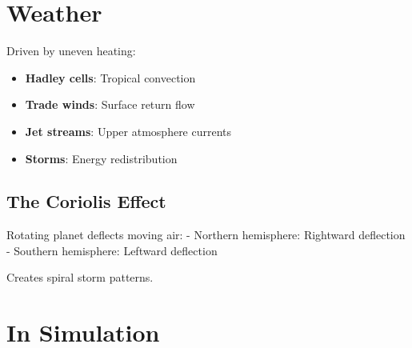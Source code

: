 \documentclass[
  11pt,
  letterpaper,
  twoside,
  openright]{book}
\providecommand{\tightlist}{%
  \setlength{\itemsep}{0pt}\setlength{\parskip}{0pt}}
\begin{document}
\section{Weather}\label{weather}

Driven by uneven heating:

\begin{itemize}
\tightlist
\item
  \textbf{Hadley cells}: Tropical convection
\item
  \textbf{Trade winds}: Surface return flow
\item
  \textbf{Jet streams}: Upper atmosphere currents
\item
  \textbf{Storms}: Energy redistribution
\end{itemize}

\subsection{The Coriolis Effect}\label{the-coriolis-effect}

Rotating planet deflects moving air: - Northern hemisphere: Rightward
deflection - Southern hemisphere: Leftward deflection

Creates spiral storm patterns.

\section{In Simulation}\label{in-simulation-8}
\end{document}
